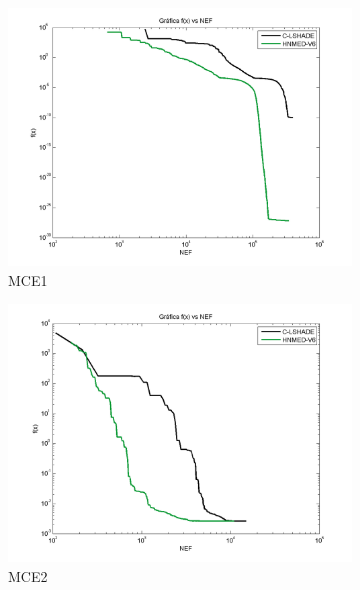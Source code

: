 \begin{figure}
	\centering
	\begin{subfigure}[b]{0.49\linewidth}
		\includegraphics[width=\linewidth]{Figures/F-Grafica_Convergencia_Problema_1}
		\caption{MCE1} \label{fig:M1} 
	\end{subfigure}
	\begin{subfigure}[b]{0.49\linewidth}
		\includegraphics[width=\textwidth]{Figures/F-Grafica_Convergencia_Problema_2}
		\caption{MCE2} \label{fig:M2} 
	\end{subfigure}
	\begin{subfigure}[b]{0.49\linewidth}

\end{subfigure}
\end{figure}
